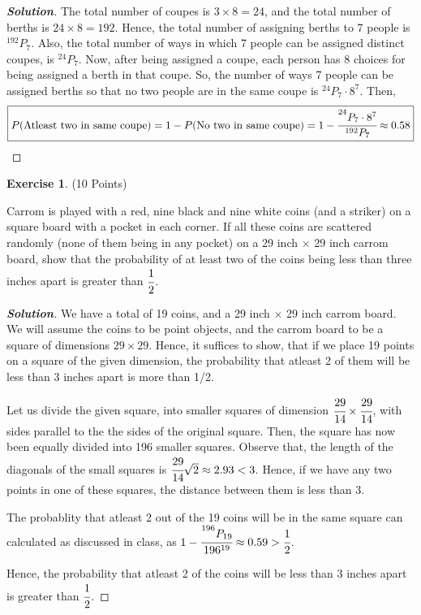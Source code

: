 \documentclass[10pt]{scrartcl}
\theoremstyle{definition}
\newtheorem{exercise}{Exercise}
\newenvironment{solution} {\begin{proof}[\normalfont \textbf{Solution}]} {\end{proof}}
\begin{document}
\begin{solution}
    The total number of coupes is $3 \times 8 = 24$, and the total number of berths is $24 \times 8 = 192$. Hence, the total number of assigning berths to 7 people is 
    $^{192}P_7$. Also, the total number of ways in which 7 people can be assigned distinct coupes, is $^{24}P_7$.
    Now, after being assigned a coupe, each person has 8 choices for being assigned a berth in that coupe. So, the number of ways 7 people
    can be assigned berths so that no two people are in the same coupe is $^{24}P_7 \cdot 8^7$. Then, 
    $$\boxed{P(\text{Atleast two in same coupe}) = 1 - P(\text{No two in same coupe}) = 1 - \cfrac{^{24}P_7\cdot8^7}{^{192}P_7} \approx 0.58}$$

\end{solution}
\begin{exercise}(10 Points)

    Carrom is played with a red, nine black and nine white coins (and a striker) on a square board
    with a pocket in each corner. If all these coins are scattered randomly (none of them being in
    any pocket) on a 29 inch $\times$ 29 inch carrom board, show that the probability of at least two of
    the coins being less than three inches apart is greater than $\cfrac{1}{2}$.
\end{exercise}
\begin{solution}
    We have a total of 19 coins, and a 29 inch $\times$ 29 inch carrom board. We will assume the coins to be point objects, 
    and the carrom board to be a square of dimensions $29 \times 29$. Hence, it suffices to show, that if we place 
    19 points on a square of the given dimension, the probability that atleast 2 of them will be less than 3 inches apart is 
    more than 1/2. 

    Let us divide the given square, into smaller squares of dimension $\cfrac{29}{14} \times \cfrac{29}{14}$, with sides parallel to the the sides of the original square. 
    Then, the square has now been equally divided into 196 smaller squares. Observe that, the length of the diagonals of the small squares is 
    $\cfrac{29}{14}\sqrt{2} \approx 2.93 < 3$. Hence, if we have any two points in one of these squares, the distance between them is less than 3.

    The probablity that atleast 2 out of the 19 coins will be in the same square can calculated as discussed in class, as 
    $1 - \cfrac{^{196}P_{19}}{196^{19}} \approx 0.59 > \cfrac{1}{2}$.

    Hence, the probability that atleast 2 of the coins will be less than 3 inches apart is greater than $\cfrac{1}{2}$.
\end{solution}
\end{document}
